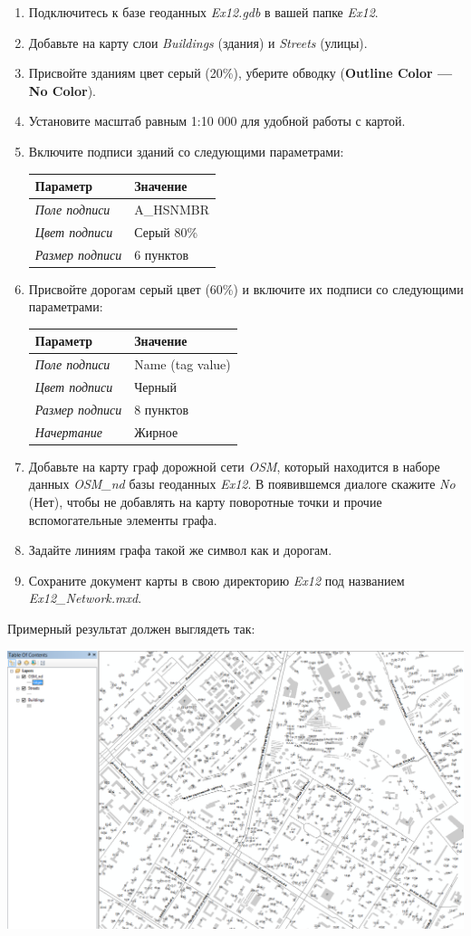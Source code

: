 \documentclass[]{book}
\theoremstyle{definition}
\theoremstyle{definition}
\theoremstyle{definition}
\theoremstyle{remark}
\begin{document}
\begin{enumerate}
\def\labelenumi{\arabic{enumi}.}
\item
  Подключитесь к базе геоданных \emph{Ex12.gdb} в вашей папке
  \emph{Ex12}.
\item
  Добавьте на карту слои \emph{Buildings} (здания) и \emph{Streets}
  (улицы).
\item
  Присвойте зданиям цвет серый (20\%), уберите обводку (\textbf{Outline
  Color --- No Color}).
\item
  Установите масштаб равным 1:10 000 для удобной работы с картой.
\item
  Включите подписи зданий со следующими параметрами:

  \begin{longtable}[]{@{}ll@{}}
  \toprule
  Параметр & Значение\tabularnewline
  \midrule
  \endhead
  \emph{Поле подписи} & A\_HSNMBR\tabularnewline
  \emph{Цвет подписи} & Серый 80\%\tabularnewline
  \emph{Размер подписи} & 6 пунктов\tabularnewline
  \bottomrule
  \end{longtable}
\item
  Присвойте дорогам серый цвет (60\%) и включите их подписи со
  следующими параметрами:

  \begin{longtable}[]{@{}ll@{}}
  \toprule
  Параметр & Значение\tabularnewline
  \midrule
  \endhead
  \emph{Поле подписи} & Name (tag value)\tabularnewline
  \emph{Цвет подписи} & Черный\tabularnewline
  \emph{Размер подписи} & 8 пунктов\tabularnewline
  \emph{Начертание} & Жирное\tabularnewline
  \bottomrule
  \end{longtable}
\item
  Добавьте на карту граф дорожной сети \emph{OSM}, который находится в
  наборе данных \emph{OSM\_nd} базы геоданных \emph{Ex12}. В появившемся
  диалоге скажите \emph{No} (Нет), чтобы не добавлять на карту
  поворотные точки и прочие вспомогательные элементы графа.
\item
  Задайте линиям графа такой же символ как и дорогам.
\item
  Сохраните документ карты в свою директорию \emph{Ex12} под названием
  \emph{Ex12\_Network.mxd}.
\end{enumerate}

Примерный результат должен выглядеть так:

\includegraphics{images/Ex12/image6.png}
\end{document}
